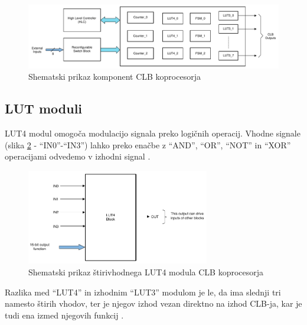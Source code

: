 \documentclass[a4paper]{article}
\begin{document}
\begin{figure}[t]
    \begin{center}
        \begin{minipage}[t]{12cm}
            \includegraphics[width=12cm]{clb_moduli}
            \caption{Shematski prikaz komponent CLB koprocesorja \cite[Pogl.~26.2]{mcu-ref-manual}}
            \label{fig:clb_moduli}
        \end{minipage}
    \end{center}
\end{figure}

\subsection{LUT moduli}\label{sec:lut}
LUT4 modul omogoča modulacijo signala preko logičnih operacij. Vhodne signale (slika \ref{fig:lut4} - ``IN0''-``IN3'') lahko preko enačbe z ``AND'', ``OR'', ``NOT'' in ``XOR'' operacijami odvedemo v izhodni signal \cite[Pogl.~3.3]{clb-user-guide}.

\begin{figure}[htb]
    \centerline{\includegraphics[width=8cm]{shema_lut}}
    \caption{Shematski prikaz štirivhodnega LUT4 modula CLB koprocesorja \cite[Pogl.~26.4.4]{mcu-ref-manual}}
    \label{fig:lut4} 
\end{figure} 

Razlika med ``LUT4'' in izhodnim ``LUT3'' modulom je le, da ima slednji tri namesto štirih vhodov, ter je njegov izhod vezan direktno na izhod CLB-ja, kar je tudi ena izmed njegovih funkcij \cite[Pogl.~26.4.4-26.4.5]{mcu-ref-manual}.
\end{document}
